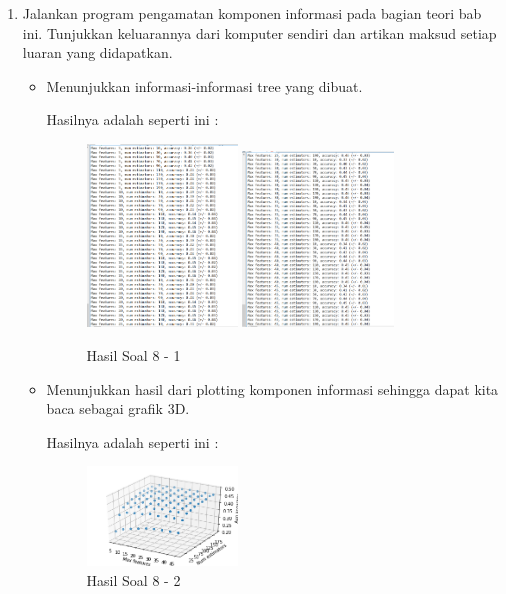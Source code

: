 \begin{enumerate}

\item Jalankan program pengamatan komponen informasi pada bagian teori bab ini. Tunjukkan keluarannya dari komputer sendiri dan artikan maksud setiap luaran yang didapatkan.
	\hfill\break
\begin{itemize}
	\item Menunjukkan informasi-informasi tree yang dibuat.
	
	Hasilnya adalah seperti ini :

	\begin{figure}[H]
	\centering
		\includegraphics[width=4cm]{figures/1174096/tugas3/soal81.PNG}
		\includegraphics[width=4cm]{figures/1174096/tugas3/soal82.PNG}
		\caption{Hasil Soal 8 - 1}
	\end{figure}

	\item Menunjukkan hasil dari plotting komponen informasi sehingga dapat kita baca sebagai grafik 3D.
	
	Hasilnya adalah seperti ini :

	\begin{figure}[H]
	\centering
		\includegraphics[width=4cm]{figures/1174096/tugas3/soal83.PNG}
		\caption{Hasil Soal 8 - 2}
	\end{figure}
\end{itemize}
\end{enumerate}

